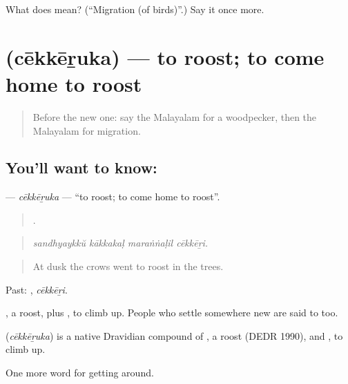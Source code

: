\begin{tcolorbox}[breakable,colback=teal!4,colframe=teal!35!black,title={Before you move on}]
What does  mean? (\textquotedblleft{}Migration (of birds)\textquotedblright{}.) Say it once more.
\end{tcolorbox}
\section[\texorpdfstring{\ml{ചേക്കേറുക} (cēkkēṟuka)}{ചേക്കേറുക (cēkkēṟuka)}]{ (cēkkēṟuka) — to roost; to come home to roost}

\label{lesson:ML-C500-cekkeruka}



\begin{quote}
Before the new one: say the Malayalam for a woodpecker, then the Malayalam for migration.
\end{quote}

\subsection*{You'll want to know: }
\textbf{} — \emph{cēkkēṟuka} — \textquotedblleft{}to roost; to come home to roost\textquotedblright{}.

\begin{quote}
   .
\end{quote}

\begin{quote}
\emph{sandhyaykkŭ kākkakaḷ maraṅṅaḷil cēkkēṟi.}
\end{quote}

\begin{quote}
At dusk the crows went to roost in the trees.
\end{quote}

Past: , \emph{cēkkēṟi}.

, a roost, plus , to climb up. People who settle somewhere new are said to  too.

\begin{cousinweb}
\textbf{} (\emph{cēkkēṟuka}) is a native Dravidian compound of , a roost (DEDR 1990), and , to climb up.
\end{cousinweb}

\begin{grammarlens}[title={What you've built}]
One more word for getting around.
\end{grammarlens}

